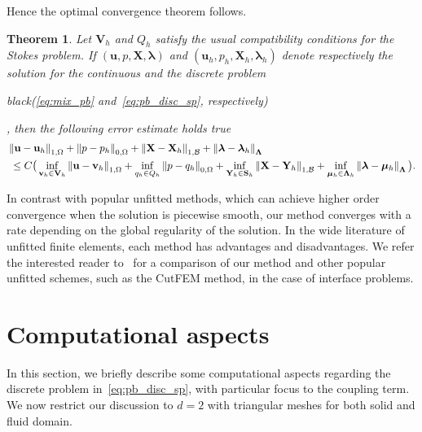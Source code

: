 \documentclass[oneside]{amsart} %
\newcommand{\norm}[1]{\left\lVert#1\right\rVert}
\newtheorem{teo}{Theorem}
\newtheorem{rem}{Remark}
\newcommand\B{\mathcal B} %
\renewcommand\u{\mathbf{u}} %
\renewcommand\v{\mathbf{v}} %
\renewcommand\S{\mathbf{S}} %
\newcommand\X{\mathbf{X}} %
\newcommand\Y{\mathbf{Y}} %
\newcommand\LL{{\boldsymbol{\Lambda}}} %
\newcommand\Vline{\mathbf{V}} %
\newcommand\Sline{\S} %
\newcommand\llambda{\boldsymbol\lambda} %
\newcommand\mmu{{\boldsymbol\mu}} %
\newcommand{\Cmatr}{\mathsf{C}}
\renewcommand\lg{\begin{color}{black}}
\newcommand\gl{\end{color}}
\begin{document}
	Hence the optimal convergence theorem follows.
	\begin{teo}
		\label{theo:brezzi}
		Let $\Vline_h$ and $Q_h$ satisfy the usual compatibility
		conditions for the Stokes problem. If $(\u,p,\X,\llambda)$ and
		$(\u_h,p_h,\X_h,\llambda_h)$ denote respectively the solution for the
		continuous and the discrete problem \lg(\eqref{eq:mix_pb}
		and~\eqref{eq:pb_disc_sp}, respectively)\gl, then the following error estimate holds true
		\begin{equation*}
			\begin{aligned}
				&\norm{\u-\u_h}_{1,\Omega} + \norm{p-p_h }_{0,\Omega}+\norm{\X-\X_h }_{1,\B}+\norm{ \llambda-\llambda_h}_{\LL}\\
				&\hspace{1mm}\leq C\big( \inf_{\v_h\in\Vline_h}\norm{\u-\v_h}_{1,\Omega} + \inf_{q_h\in Q_h}\norm{p-q_h}_{0,\Omega} + \inf_{\Y_h\in\Sline_h}\norm{\X-\Y_h}_{1,\B} + 
				\inf_{\mmu_h\in\LL_h}\norm{\llambda-\mmu_h}_{\LL} \big).
			\end{aligned}
		\end{equation*}
	\end{teo}
	
	In contrast with popular unfitted methods, which can achieve higher
	order convergence when the solution is piecewise smooth, our method
	converges with a rate depending on the global regularity of the
	solution.
	In the wide literature of unfitted finite elements, each method has
	advantages and disadvantages. We refer the interested reader to~\cite{comparison}
	for a comparison of our method and other popular unfitted schemes, such
	as the CutFEM method, in the case of interface problems.
	
	\section{Computational aspects}\label{sec:interface}%
	
	In this section, we briefly describe some computational aspects regarding the discrete problem in~\eqref{eq:pb_disc_sp}, with particular focus to the coupling term. We now restrict our discussion to $d=2$ with triangular meshes for both solid and fluid domain. 
	
\end{document}

